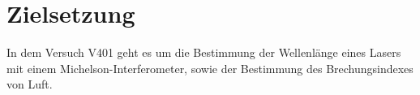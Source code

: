 \section{Zielsetzung} 

\begin{flushleft}
    In dem Versuch V401 geht es um die Bestimmung der Wellenlänge eines Lasers mit einem Michelson-Interferometer, sowie der Bestimmung des Brechungsindexes von Luft.
\end{flushleft}